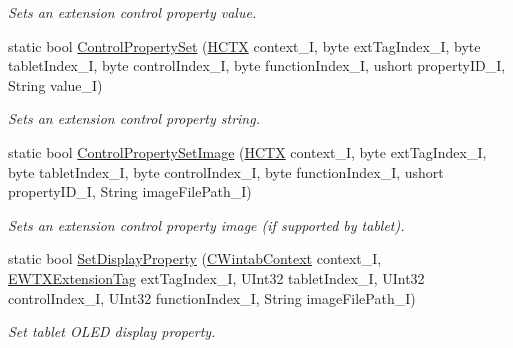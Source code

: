 \begin{DoxyCompactItemize}
\begin{DoxyCompactList}\small\item\em Sets an extension control property value. \end{DoxyCompactList}\item 
static bool \mbox{\hyperlink{class_wintab_d_n_1_1_c_wintab_extensions_a12bb26b5c04d235203bdd18a48f16b68}{Control\+Property\+Set}} (\mbox{\hyperlink{class_wintab_d_n_1_1_h_c_t_x}{H\+C\+TX}} context\+\_\+I, byte ext\+Tag\+Index\+\_\+I, byte tablet\+Index\+\_\+I, byte control\+Index\+\_\+I, byte function\+Index\+\_\+I, ushort property\+I\+D\+\_\+I, String value\+\_\+I)
\begin{DoxyCompactList}\small\item\em Sets an extension control property string. \end{DoxyCompactList}\item 
static bool \mbox{\hyperlink{class_wintab_d_n_1_1_c_wintab_extensions_a631b5401d1dc5614ce194ec259c12e43}{Control\+Property\+Set\+Image}} (\mbox{\hyperlink{class_wintab_d_n_1_1_h_c_t_x}{H\+C\+TX}} context\+\_\+I, byte ext\+Tag\+Index\+\_\+I, byte tablet\+Index\+\_\+I, byte control\+Index\+\_\+I, byte function\+Index\+\_\+I, ushort property\+I\+D\+\_\+I, String image\+File\+Path\+\_\+I)
\begin{DoxyCompactList}\small\item\em Sets an extension control property image (if supported by tablet). \end{DoxyCompactList}\item 
static bool \mbox{\hyperlink{class_wintab_d_n_1_1_c_wintab_extensions_ad35998f82be4c5ff67e3c476d89bcbdb}{Set\+Display\+Property}} (\mbox{\hyperlink{class_wintab_d_n_1_1_c_wintab_context}{C\+Wintab\+Context}} context\+\_\+I, \mbox{\hyperlink{namespace_wintab_d_n_a303ef868b8887dc43872ddac8a7d059b}{E\+W\+T\+X\+Extension\+Tag}} ext\+Tag\+Index\+\_\+I, U\+Int32 tablet\+Index\+\_\+I, U\+Int32 control\+Index\+\_\+I, U\+Int32 function\+Index\+\_\+I, String image\+File\+Path\+\_\+I)
\begin{DoxyCompactList}\small\item\em Set tablet O\+L\+ED display property. \end{DoxyCompactList}\end{DoxyCompactItemize}
